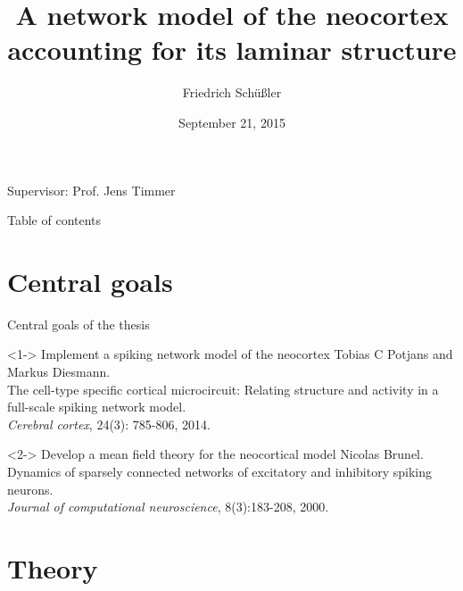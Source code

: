 \documentclass[xcolor=x11names,compress]{beamer}
\renewcommand{\(}{\begin{columns}}
\renewcommand{\)}{\end{columns}}
\newcommand{\<}[1]{\begin{column}{#1}}
\renewcommand{\>}{\end{column}}
\begin{document}
\begin{frame}{}
\title[Neocortex]{A network model of the neocortex accounting for its laminar structure}
\author{
Friedrich Schüßler}
\date{\normalsize September 21, 2015}
\titlepage

\centering 
Supervisor: Prof. Jens Timmer
\end{frame}

\begin{frame}{Table of contents}
    \tableofcontents
\end{frame}


\section{Central goals}

\begin{frame}[t]{Central goals of the thesis}
    \begin{block}<1->
        {Implement a spiking network model of the neocortex}
        \vspace{0.2cm}
        \footnotesize
        Tobias C Potjans and Markus Diesmann. \\
        The cell-type specific cortical microcircuit:
        Relating structure and activity in a full-scale spiking network model. \\
        \textit{Cerebral cortex}, 24(3): 785-806, 2014.
    \end{block}
    \vfill
    \begin{block}<2->
        {Develop a mean field theory for the neocortical model}
        \vspace{0.2cm}
        \footnotesize
        Nicolas Brunel. \\
        Dynamics of sparsely connected networks of excitatory and inhibitory spiking 
        neurons. \\
        \textit{Journal of computational neuroscience}, 8(3):183-208, 2000.
    \end{block}
\end{frame}


\section{Theory}
\label{sec:theory}
\end{document}
